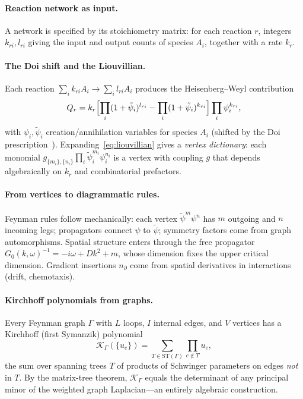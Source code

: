 \documentclass[11pt,a4paper]{article}
\newcommand{\psit}{\tilde\psi}
\theoremstyle{plain}
\begin{document}
\paragraph{Reaction network as input.}
A network is specified by its stoichiometry matrix: for each
reaction $r$, integers $k_{ri}, l_{ri}$ giving the input and
output counts of species $A_i$, together with a rate $k_r$.

\paragraph{The Doi shift and the Liouvillian.}
Each reaction $\sum_i k_{ri} A_i \to \sum_i l_{ri} A_i$ produces
the Heisenberg--Weyl contribution
\begin{equation}\label{eq:liouvillian}
  Q_r
  = k_r
  \Bigl[\prod_i (1+\psit_i)^{l_{ri}}
        - \prod_i (1+\psit_i)^{k_{ri}}\Bigr]
  \prod_i \psi_i^{k_{ri}},
\end{equation}
with $\psi_i, \psit_i$ creation/annihilation variables for
species $A_i$ (shifted by the Doi prescription~\cite{Tauber}).
Expanding~\eqref{eq:liouvillian} gives a \emph{vertex dictionary}:
each monomial $g_{\{m_i\},\{n_i\}}\prod_i
\psit_i^{m_i}\psi_i^{n_i}$ is a vertex with coupling $g$ that
depends algebraically on $k_r$ and combinatorial prefactors.

\paragraph{From vertices to diagrammatic rules.}
Feynman rules follow mechanically: each vertex $\psit^m\psi^n$
has $m$ outgoing and $n$ incoming legs; propagators connect
$\psi$ to $\psit$; symmetry factors come from graph
automorphisms.  Spatial structure enters through the free
propagator $G_0(k,\omega)^{-1} = -i\omega + Dk^2 + m$, whose
dimension fixes the upper critical dimension.  Gradient
insertions $n_\partial$ come from spatial derivatives in
interactions (drift, chemotaxis).

\paragraph{Kirchhoff polynomials from graphs.}
Every Feynman graph $\Gamma$ with $L$ loops, $I$ internal edges,
and $V$ vertices has a Kirchhoff (first Symanzik)
polynomial~\cite{BognerWeinzierl}
\begin{equation}\label{eq:kirchhoff}
  \mathcal{K}_\Gamma(\{u_e\})
  = \sum_{T \in \mathrm{ST}(\Gamma)} \prod_{e \notin T} u_e,
\end{equation}
the sum over spanning trees $T$ of products of Schwinger
parameters on edges \emph{not} in $T$.  By the matrix-tree
theorem, $\mathcal{K}_\Gamma$ equals the determinant of any
principal minor of the weighted graph Laplacian---an entirely
algebraic construction.
\end{document}
